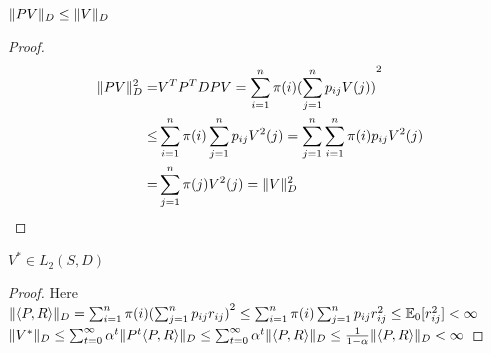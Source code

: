 \begin{lem}
    $ \Arrowvert PV \Arrowvert_D \le \Arrowvert V \Arrowvert_D $ 
    \begin{proof}
        \begin{equation}
            \begin{aligned}
                \Arrowvert PV \Arrowvert^2_D =& V^T P^T D P V = 
                \sum^{n}_{i=1} \pi(i) {( \sum^{n}_{j=1} p_{ij} V(j))}^2 \\
                \le& \sum^{n}_{i=1} \pi(i) \sum^{n}_{j=1} p_{ij} V^2(j)
                = \sum^{n}_{j=1} \sum^{n}_{i=1} \pi(i) p_{ij} V^2(j) \\
                =& \sum^{n}_{j=1} \pi(j) V^2(j) = \Arrowvert V \Arrowvert^2_D 
            \end{aligned}
        \end{equation}
    \end{proof}
\end{lem}

\begin{lem}
    $ V^* \in L_2(S,D) $ 
    \begin{proof}Here\\
        $ \Arrowvert \langle P, R \rangle \Arrowvert_D 
        = \sum^{n}_{i=1} \pi(i) {( \sum^{n}_{j=1} p_{ij} r_{ij})}^2  
        \le \sum^{n}_{i=1} \pi(i) \sum^{n}_{j=1} p_{ij} r^2_{ij}
        \le \mathbb{E}_0[r^2_{ij}] < \infty$ \\
        $ \Arrowvert V^* \Arrowvert_D \le \sum^{\infty}_{t=0} \alpha^t \Arrowvert  P^t \langle P, R \rangle \Arrowvert_D 
        \le \sum^{\infty}_{t=0} \alpha^t \Arrowvert \langle P, R \rangle \Arrowvert_D 
        \le \frac{1}{1-\alpha} \Arrowvert \langle P, R \rangle \Arrowvert_D < \infty $
    \end{proof}
\end{lem}

